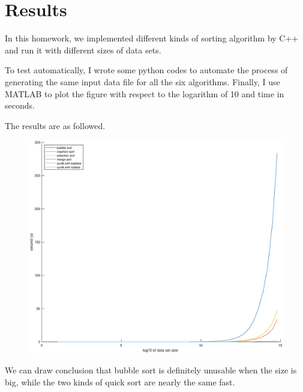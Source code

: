 \documentclass[12pt,a4paper]{article}
\begin{document}

\newpage

\onehalfspacing
\newpage

\section{Results}

In this homework, we implemented different kinds of sorting algorithm by C++ and run it with different sizes of data sets.

To test automatically, I wrote some python codes to automate the process of generating the same input data 
file for all the six algorithms.
Finally, I use MATLAB to plot the figure with respect to the logarithm of 10 and time in seconds.

The results are as followed.

\begin{figure}[H]
\includegraphics[width=1.1\textwidth]{lines}
\end{figure}

We can draw conclusion that bubble sort is definitely unusable when the size is big, while the two kinds of quick sort are nearly the same fast.

%
\end{document}
